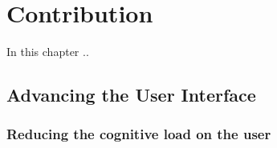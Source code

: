 \chapter{Contribution}
In this chapter ..

\section{Advancing the User Interface}

	\subsection{Reducing the cognitive load on the user}
